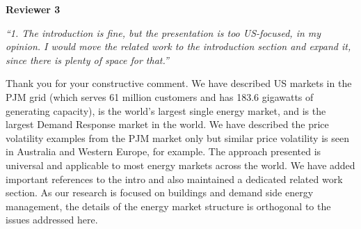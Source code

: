 \documentclass[11pt]{article}
\begin{document}
\vspace*{0.5cm}
\noindent \textbf{Reviewer 3}

\vspace*{0.5cm}
\noindent \emph{``1. The introduction is fine, but the presentation is too US-focused, in my opinion. I would move the related work to the introduction section and expand it, since there is plenty of space for that.''}

\color{blue}
\vspace*{0.25cm}
\noindent Thank you for your constructive comment. We have described US markets in the PJM grid (which serves 61 million customers and has 183.6 gigawatts of generating capacity), is the world's largest single energy market, and is the largest Demand Response market in the world. We have described the price volatility examples from the PJM market only but similar price volatility is seen in Australia and Western Europe, for example. The approach presented is universal and applicable to most energy markets across the world. We have added important references to the intro and also maintained a dedicated related work section. As our research is focused on buildings and demand side energy management, the details of the energy market structure is orthogonal to the issues addressed here.
\color{black}
\end{document}
